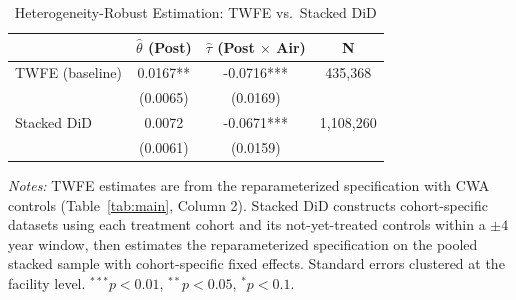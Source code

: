 \begin{table}[htbp]
\centering
\caption{Heterogeneity-Robust Estimation: TWFE vs.\ Stacked DiD}
\label{tab:stacked}
\begin{tabular}{lccc}
\toprule
& $\hat{\theta}$ (Post) & $\hat{\tau}$ (Post $\times$ Air) & N \\
\midrule
TWFE (baseline) & 0.0167** & -0.0716*** & 435,368 \\
& (0.0065) & (0.0169) & \\[6pt]
Stacked DiD & 0.0072 & -0.0671*** & 1,108,260 \\
& (0.0061) & (0.0159) & \\
\bottomrule
\end{tabular}
\begin{minipage}{0.95\textwidth}
\vspace{0.3em}
\footnotesize \textit{Notes:} TWFE estimates are from the reparameterized specification with CWA controls (Table~\ref{tab:main}, Column 2). Stacked DiD constructs cohort-specific datasets using each treatment cohort and its not-yet-treated controls within a $\pm 4$ year window, then estimates the reparameterized specification on the pooled stacked sample with cohort-specific fixed effects. Standard errors clustered at the facility level. $^{***}p<0.01$, $^{**}p<0.05$, $^{*}p<0.1$.
\end{minipage}
\end{table}
